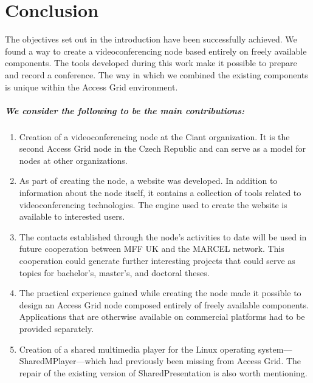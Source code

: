 \chapter{Conclusion}

The objectives set out in the introduction have been successfully achieved. We found a way to create a videoconferencing node based entirely on freely available components. The tools developed during this work make it possible to prepare and record a conference. The way in which we combined the existing components is unique within the Access Grid environment.

\paragraph*{We consider the following to be the main contributions:}
\begin{enumerate}
\item Creation of a videoconferencing node at the Ciant organization. It is the second Access Grid node in the Czech Republic and can serve as a model for nodes at other organizations.

\item As part of creating the node, a website was developed. In addition to information about the node itself, it contains a collection of tools related to videoconferencing technologies. The engine used to create the website is available to interested users.

\item The contacts established through the node's activities to date will be used in future cooperation between MFF UK and the MARCEL network. This cooperation could generate further interesting projects that could serve as topics for bachelor's, master's, and doctoral theses.

\item The practical experience gained while creating the node made it possible to design an Access Grid node composed entirely of freely available components. Applications that are otherwise available on commercial platforms had to be provided separately.

\item Creation of a shared multimedia player for the Linux operating system—SharedMPlayer—which had previously been missing from Access Grid. The repair of the existing version of SharedPresentation is also worth mentioning.


\end{enumerate}
